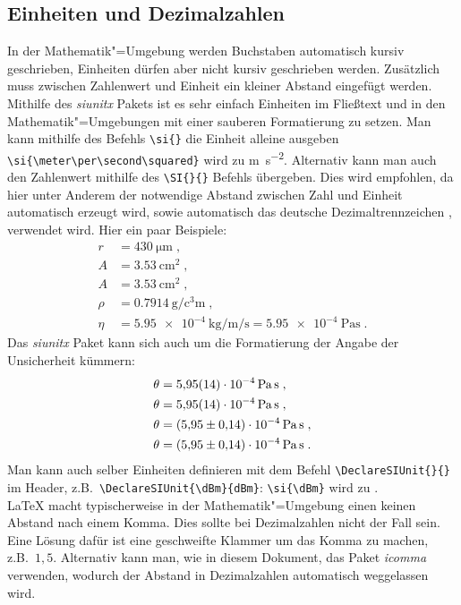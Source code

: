 \subsection{Einheiten und Dezimalzahlen}
\label{sec:Einheiten}
 In der Mathematik"=Umgebung werden Buchstaben automatisch kursiv geschrieben, Einheiten dürfen aber nicht kursiv geschrieben werden. Zusätzlich muss zwischen Zahlenwert und Einheit ein kleiner Abstand eingefügt werden. Mithilfe des \textit{siunitx} Pakets ist es sehr einfach Einheiten im Fließtext und in den Mathematik"=Umgebungen mit einer sauberen Formatierung zu setzen. Man kann mithilfe des Befehls \verb"\si{}" die Einheit alleine ausgeben \verb"\si{\meter\per\second\squared}" wird zu \si{\meter\per\second\squared}. Alternativ kann man auch den Zahlenwert mithilfe des \verb"\SI{}{}" Befehls übergeben. Dies wird empfohlen, da hier unter Anderem der notwendige Abstand zwischen Zahl und Einheit automatisch erzeugt wird, sowie automatisch das deutsche Dezimaltrennzeichen , verwendet wird. Hier ein paar Beispiele:
\begin{align*} \label{eq:einhbsp}
r&=\SI{430}{\micro\meter}\; , \\
A&=\SI{3,53}{\centi\meter\squared}\; , \\
A&=\SI{3.53}{\centi\meter\squared}\; , \\
\rho&=\SI{0,7914}{\gram\per\cubic\centi\meter} \; , \\
\eta&=\SI{5,95e-4}{\kilo\gram\per\meter\per\second} = \SI{5,95e-4}{\pascal\second} \; .
\end{align*}
Das \textit{siunitx} Paket kann sich auch um die Formatierung der Angabe der Unsicherheit kümmern:
\begin{align*}
\theta& =\SI[separate-uncertainty=false]{5,95(14)e-4}{\pascal\second}\; ,\\
\theta& =\SI[separate-uncertainty=false]{5,95\pm0.14 e-4}{\pascal\second}\; ,\\
\theta& =\SI[separate-uncertainty=true]{5,95(14)e-4}{\pascal\second}\; ,\\
\theta& =\SI[separate-uncertainty=true]{5,95\pm0.14 e-4}{\pascal\second}\; .
\end{align*}
Man kann auch selber Einheiten definieren mit dem Befehl \verb"\DeclareSIUnit{}{}" im Header, z.B.\  \verb"\DeclareSIUnit{\dBm}{dBm}": \verb"\si{\dBm}" wird zu \si{\dBm}.\\
\LaTeX{} macht typischerweise in der Mathematik"=Umgebung einen keinen Abstand nach einem Komma. Dies sollte bei Dezimalzahlen nicht der Fall sein. Eine Lösung dafür ist eine geschweifte Klammer um das Komma zu machen, z.B.\ $1{,}5$. Alternativ kann man, wie in diesem Dokument, das Paket \textit{icomma} verwenden, wodurch der Abstand in Dezimalzahlen automatisch weggelassen wird.
